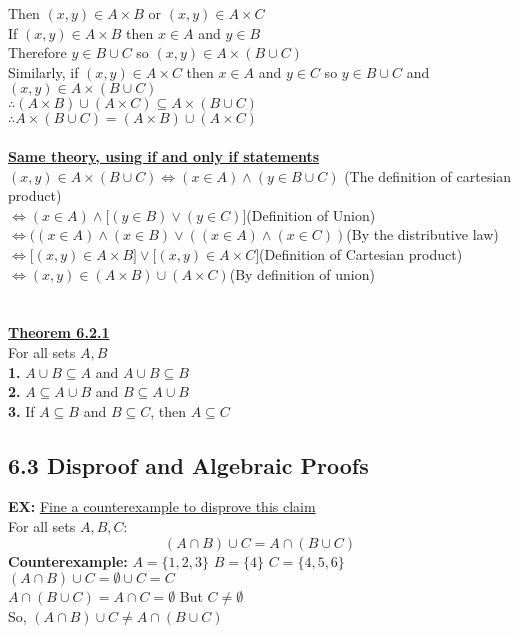 \documentclass{article}
\begin{document}
 		Then $(x,y)\in A\times B$ or $(x,y)\in A\times C$\\
 		If $(x,y)\in A\times B$ then $x\in A$ and $y\in B$\\
 		Therefore $y\in B\cup C$ so $(x,y)\in A\times(B\cup C)$\\
 		Similarly, if $(x,y)\in A\times C$ then $x\in A$ and $y\in C$ so $y\in B\cup C$ and $(x,y)\in A\times(B\cup C)$\\
 		$\therefore(A\times B)\cup(A\times C)\subseteq A\times(B\cup C)$\\
 		$\therefore A\times(B\cup C) = (A\times B)\cup (A\times C)$\\
 		\\
 		\textbf{\underline{Same theory, using if and only if statements}}\\
 		$(x,y)\in A\times(B\cup C)\iff (x\in A)\land(y\in B\cup C)$ (The definition of cartesian product)\\
 		$\iff (x\in A)\land\lbrack(y\in B)\lor(y\in C)\rbrack$(Definition of Union)\\
 		$\iff ((x\in A)\land (x\in B)\lor((x\in A)\land(x\in C))$(By the distributive law)\\
 		$\iff \lbrack(x,y)\in A\times B\rbrack \lor \lbrack(x,y)\in A\times C\rbrack$(Definition of Cartesian product)\\
 		$\iff (x,y)\in (A\times B)\cup(A\times C)$(By definition of union)\\
 		\\ \\
 		\underline{\textbf{Theorem 6.2.1}}\\
 		For all sets $A,B$\\
 		\textbf{1.} $A\cup B\subseteq A$ and $A\cup B\subseteq B$\\
 		\textbf{2.} $A\subseteq A\cup B$ and $B\subseteq A\cup B$\\
 		\textbf{3.} If $A\subseteq B$ and $B\subseteq C$, then $A\subseteq C$
 		\subsection*{6.3 Disproof and Algebraic Proofs}
 		\textbf{EX:} \underline{Fine a counterexample to disprove this claim}\\
 		For all sets $A,B,C$:
 		$$(A\cap B)\cup C=A\cap(B\cup C)$$
 		\textbf{Counterexample:} $A = \{1,2,3\}$ $B=\{4\}$ $C=\{4,5,6\}$\\
 		$(A\cap B)\cup C = \emptyset \cup C = C$\\
 		$A\cap(B\cup C) = A\cap C = \emptyset$ But $C\neq \emptyset$\\
 		So, $(A\cap B)\cup C\neq A\cap(B\cup C)$
\end{document}
